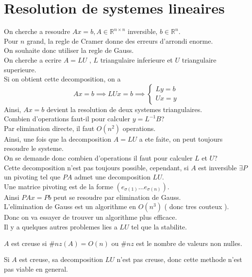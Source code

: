 \documentclass[../main.tex]{subfiles}
\begin{document}
\section{Resolution de systemes lineaires}
On cherche a resoudre $Ax= b, A \in \mathbb{R}^{n\times n}$ inversible, $ b \in \mathbb{R}^n$.\\
Pour $n$ grand, la regle de Cramer donne des erreurs d'arrondi enorme.\\
On souhaite donc utiliser  la regle de Gauss.\\
On cherche a ecrire $A = LU$ , $L$ triangulaire inferieure et $U$ triangulaire superieure.\\
Si on obtient cette decomposition, on a
\[ 
Ax = b \implies LUx = b \implies 
\begin{cases}
Ly = b\\
Ux= y
\end{cases}
\]
Ainsi, $Ax= b$ devient la resolution de deux systemes triangulaires.\\
Combien d'operations faut-il pour calculer $y = L^{-1}B$?\\
Par elimination directe, il faut $ O( n^{2}) $ operations.\\
Ainsi, une fois que la decomposition $A= LU$ a ete faite, on peut toujours resoudre le systeme.\\
On se demande donc combien d'operations il faut pour calculer $L$ et $U$?\\
Cette decomposition n'est pas toujours possible, cependant, si $A$ est inversible $\exists P$ un pivoting tel que $PA$ admet une decomposition $LU$.\\
Une matrice pivoting est de la forme $ \left( e_{\sigma ( 1)} \ldots e_{ \sigma( n) }  \right) $.\\
Ainsi $ PAx = Pb$ peut se resoudre par elimination de Gauss.\\
L'elimination de Gauss est un algorithme en $ O( n^{3}) $ ( donc tres couteux ).\\
Donc on va essayer de trouver un algorithme plus efficace.\\
Il y a quelques autres problemes lies a $ LU$ tel que la stabilite.
\begin{defn}
	$A$ est creuse si $ \# nz ( A) = O( n) $ ou $ \# nz$ est le nombre de valeurs non nulles.
\end{defn}
Si $A$ est creuse, sa decomposition $LU$  n'est pas creuse, donc cette methode n'est pas viable en general.
\end{document}
